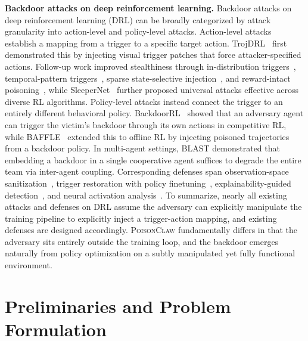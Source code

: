 \documentclass{article}
\newcommand{\algname}{\textsc{PoisonClaw}\xspace}
\begin{document}
\noindent\textbf{Backdoor attacks on deep reinforcement learning.}\quad
Backdoor attacks on deep reinforcement learning (DRL) can be broadly categorized by attack granularity into action-level and policy-level attacks.
Action-level attacks establish a mapping from a trigger to a specific target action.
TrojDRL~\citep{kiourti2020trojdrl} first demonstrated this by injecting visual trigger patches that force attacker-specified actions.
Follow-up work improved stealthiness through in-distribution triggers~\citep{ashcraft2021poisoning}, temporal-pattern triggers~\citep{yu2022temporal}, sparse state-selective injection~\citep{cui2024badrl}, and reward-intact poisoning~\citep{rathbun2026beware,rathbun2024adversarial}, while SleeperNet~\citep{rathbun2024sleepernets} further proposed universal attacks effective across diverse RL algorithms.
Policy-level attacks instead connect the trigger to an entirely different behavioral policy.
BackdoorRL~\citep{wang2021backdoorl} showed that an adversary agent can trigger the victim's backdoor through its own actions in competitive RL, while BAFFLE~\citep{gong2024baffle} extended this to offline RL by injecting poisoned trajectories from a backdoor policy.
In multi-agent settings, BLAST \citep{fang2025blast} demonstrated that embedding a backdoor in a single cooperative agent suffices to degrade the entire team via inter-agent coupling.
Corresponding defenses span observation-space sanitization~\citep{bharti2022provable}, trigger restoration with policy finetuning~\citep{chen2023bird}, explainability-guided detection~\citep{yuan2024shine}, and neural activation analysis~\citep{vyas2024mitigating}.
To summarize, nearly all existing attacks and defenses on DRL assume the adversary can explicitly manipulate the training pipeline to explicitly inject a trigger-action mapping, and existing defenses are designed accordingly.
\algname fundamentally differs in that the adversary sits entirely outside the training loop, and the backdoor emerges naturally from policy optimization on a subtly manipulated yet fully functional environment.







\section{Preliminaries and Problem Formulation}
\end{document}
